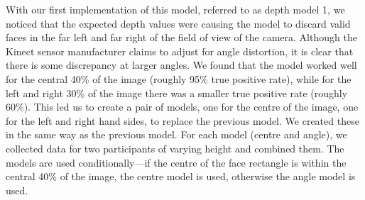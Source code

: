 \documentclass[conference]{IEEEtran}
\begin{document}
With our first implementation of this model, referred to as depth model 1, we noticed that the expected depth values were causing the model to discard valid faces in the far left and far right of the field of view of the camera. Although the Kinect sensor manufacturer claims to adjust for angle distortion, it is clear that there is some discrepancy at larger angles. We found that the model worked well for the central 40\% of the image (roughly 95\% true positive rate), while for the left and right 30\% of the image there was a smaller true positive rate (roughly 60\%). This led us to create a pair of models, one for the centre of the image, one for the left and right hand sides, to replace the previous model. We created these in the same way as the previous model. For each model (centre and angle), we collected data for two participants of varying height and combined them. The models are used conditionally---if the centre of the face rectangle is within the central 40\% of the image, the centre model is used, otherwise the angle model is used.
\end{document}
